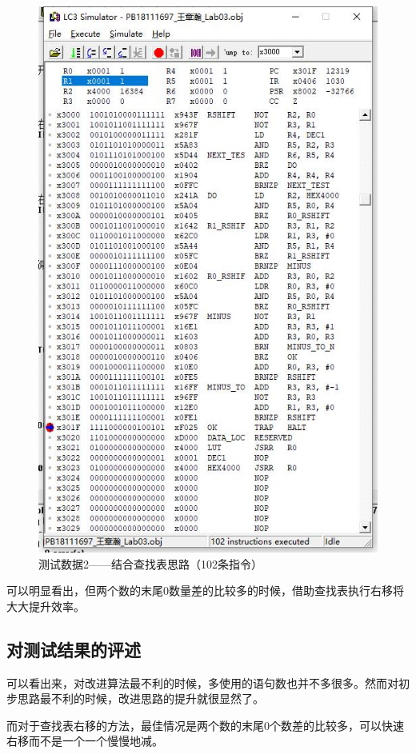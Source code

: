 \documentclass[UTF8]{article}
\begin{document}
\begin{figure}[H]
\begin{minipage}[H]{0.48\linewidth}
			\includegraphics[scale=0.45]{data3_3.jpg}
			\caption{测试数据2——结合查找表思路（102条指令）}
			\label{data3_3}
		\end{minipage}
	\end{figure}
	可以明显看出，但两个数的末尾0数量差的比较多的时候，借助查找表执行右移将大大提升效率。
	
	
	
	\subsection{对测试结果的评述}
	可以看出来，对改进算法最不利的时候，多使用的语句数也并不多很多。然而对初步思路最不利的时候，改进思路的提升就很显然了。\par
	而对于查找表右移的方法，最佳情况是两个数的末尾0个数差的比较多，可以快速右移而不是一个一个慢慢地减。\par
\end{document}
